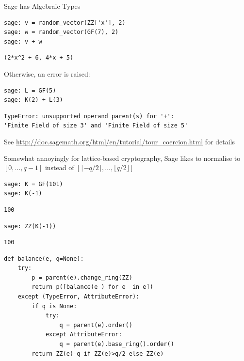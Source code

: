 \documentclass[presentation,smaller]{beamer}
\begin{document}
\begin{frame}{Sage has Algebraic Types}
\lstset{language=sage,label= ,caption= ,captionpos=b,numbers=none}
\begin{lstlisting}
sage: v = random_vector(ZZ['x'], 2)
sage: w = random_vector(GF(7), 2)
sage: v + w
\end{lstlisting}

\begin{verbatim}
(2*x^2 + 6, 4*x + 5)
\end{verbatim}

\framebreak

Otherwise, an error is raised:

\lstset{language=sage,label= ,caption= ,captionpos=b,numbers=none}
\begin{lstlisting}
sage: L = GF(5)
sage: K(2) + L(3)
\end{lstlisting}

\begin{verbatim}
TypeError: unsupported operand parent(s) for '+': 
'Finite Field of size 3' and 'Finite Field of size 5'
\end{verbatim}

See \url{http://doc.sagemath.org/html/en/tutorial/tour\_coercion.html} for details

\framebreak

Somewhat annoyingly for lattice-based cryptography, Sage likes to normalise to \([0,\ldots,q-1]\) instead of \([\lceil -q/2 \rceil,\ldots, \lfloor q/2 \rfloor]\)

\lstset{language=sage,label= ,caption= ,captionpos=b,numbers=none}
\begin{lstlisting}
sage: K = GF(101)
sage: K(-1)
\end{lstlisting}

\begin{verbatim}
100
\end{verbatim}

\lstset{language=sage,label= ,caption= ,captionpos=b,numbers=none}
\begin{lstlisting}
sage: ZZ(K(-1))
\end{lstlisting}

\begin{verbatim}
100
\end{verbatim}

\framebreak

\lstset{language=sage,label= ,caption= ,captionpos=b,numbers=none}
\begin{lstlisting}
def balance(e, q=None):
    try:
        p = parent(e).change_ring(ZZ)
        return p([balance(e_) for e_ in e])
    except (TypeError, AttributeError):
        if q is None:
            try:
                q = parent(e).order()
            except AttributeError:
                q = parent(e).base_ring().order()
        return ZZ(e)-q if ZZ(e)>q/2 else ZZ(e)


\end{lstlisting}
\end{frame}
\end{document}
